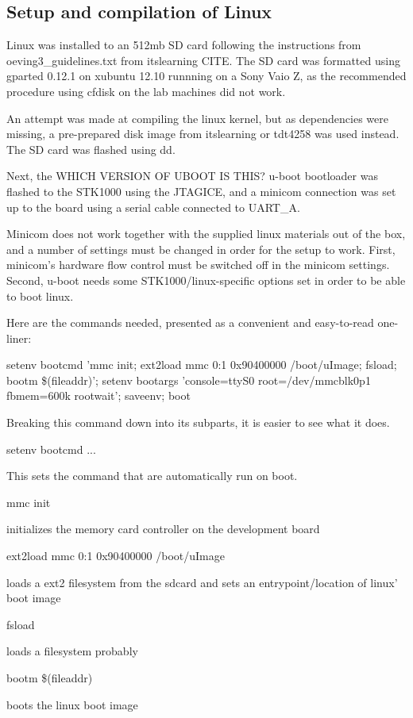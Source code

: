 
\subsection{Setup and compilation of Linux}

Linux was installed to an 512mb SD card following the instructions from oeving3_guidelines.txt from itslearning CITE. 
The SD card was formatted using gparted 0.12.1 on xubuntu 12.10 runnning on a Sony Vaio Z, as the recommended procedure using cfdisk on the lab machines did not work.

An attempt was made at compiling the linux kernel, but as dependencies were missing, a pre-prepared disk image from itslearning or tdt4258 was used instead. The SD card was flashed using dd.

Next, the WHICH VERSION OF UBOOT IS THIS? u-boot bootloader was flashed to the STK1000 using the JTAGICE, and a minicom connection was set up to the board using a serial cable connected to UART_A.

Minicom does not work together with the supplied linux materials out of the box, and a number of settings must be changed in order for the setup to work.
First, minicom's hardware flow control must be switched off in the minicom settings.
Second, u-boot needs some STK1000/linux-specific options set in order to be able to boot linux.

Here are the commands needed, presented as a convenient and easy-to-read one-liner:

setenv bootcmd 'mmc init; ext2load mmc 0:1 0x90400000 /boot/uImage; fsload; bootm \$(fileaddr)'; setenv bootargs 'console=ttyS0 root=/dev/mmcblk0p1 fbmem=600k rootwait'; saveenv; boot

Breaking this command down into its subparts, it is easier to see what it does.

setenv bootcmd ...

This sets the command that are automatically run on boot.

mmc init

initializes the memory card controller on the development board

ext2load mmc 0:1 0x90400000 /boot/uImage

loads a ext2 filesystem from the sdcard and sets an entrypoint/location of linux' boot image

fsload

loads a filesystem probably

bootm \$(fileaddr)

boots the linux boot image

